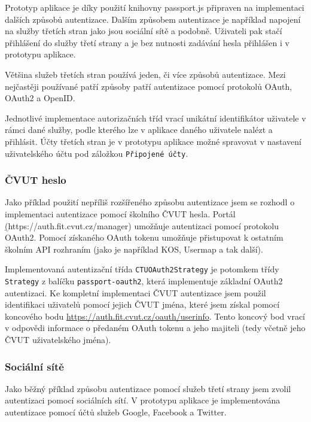 Prototyp aplikace je díky použití knihovny passport.js připraven na implementaci dalších způsobů autentizace.
Dalším způsobem autentizace je například napojení na služby třetích stran jako jsou sociální sítě a podobně.
Uživateli pak stačí přihlášení do služby třetí strany a je bez nutnosti zadávání hesla přihlášen i v prototypu aplikace.

Většina služeb třetích stran používá jeden, či více způsobů autentizace.
Mezi nejčastěji používané patří způsoby patří autentizace pomocí protokolů OAuth, OAuth2 a OpenID.

Jednotlivé implementace autorizačních tříd vrací unikátní identifikátor uživatele v rámci dané služby, podle kterého lze v aplikace daného uživatele nalézt a přihlásit.
Účty třetích stran je v prototypu aplikace možné spravovat v nastavení uživatelského účtu pod záložkou \texttt{Připojené účty}.

\subsubsection{ČVUT heslo}

Jako příklad použití nepříliš rozšířeného způsobu autentizace jsem se rozhodl o implementaci autentizace pomocí školního \gls{ČVUT} hesla.
Portál \href{auth.fit.cvut.cz}(https://auth.fit.cvut.cz/manager) umožňuje autentizaci pomocí protokolu OAuth2.
Pomocí získaného OAuth tokenu umožňuje přistupovat k ostatním školním \gls{API} rozhraním (jako je například KOS, Usermap a tak další).

Implementovaná autentizační třída \texttt{CTUOAuth2Strategy} je potomkem třídy \texttt{Strategy} z balíčku \texttt{passport-oauth2}, která implementuje základní OAuth2 autentizaci.
Ke kompletní implementaci \gls{ČVUT} autentizace jsem použil identifikaci uživatelů pomocí jejich \gls{ČVUT} jména, které jsem získal pomocí koncového bodu \url{https://auth.fit.cvut.cz/oauth/userinfo}.
Tento koncový bod vrací v odpovědi informace o předaném OAuth tokenu a jeho majiteli (tedy včetně jeho \gls{ČVUT} uživatelského jména).

\subsubsection{Sociální sítě}

Jako běžný příklad způsobu autentizace pomocí služeb třetí strany jsem zvolil autentizaci pomocí sociálních sítí.
V prototypu aplikace je implementována autentizace pomocí účtů služeb Google, Facebook a Twitter.

